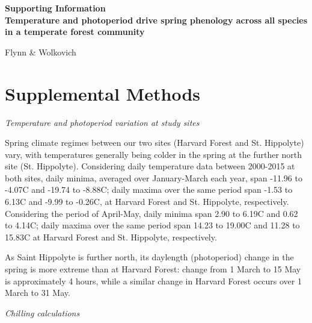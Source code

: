\documentclass{article}
\begin{document}

\begin{center}
\textbf{\Large{Supporting Information \vspace{1ex}\\Temperature and photoperiod drive spring phenology across all species in a temperate forest community}}

Flynn \& Wolkovich
\end{center}

\renewcommand{\thetable}{S\arabic{table}}
\renewcommand{\thefigure}{S\arabic{figure}}

\section*{Supplemental Methods}

\noindent\emph{Temperature and photoperiod variation at study sites}

\noindent Spring climate regimes between our two sites (Harvard Forest and St. Hippolyte) vary, with temperatures generally being colder in the spring at the further north site (St. Hippolyte). Considering daily temperature data between 2000-2015 at both sites, daily minima, averaged over January-March each year, span -11.96 to -4.07\degree C and -19.74 to -8.88\degree C; daily maxima over the same period span -1.53 to 6.13\degree C and -9.99 to -0.26\degree C, at Harvard Forest and St. Hippolyte, respectively. Considering the period of April-May, daily minima span 2.90 to 6.19\degree C and 0.62 to 4.14\degree C; daily maxima over the same period span 14.23 to 19.00\degree C and 11.28 to 15.83\degree C at Harvard Forest and St. Hippolyte, respectively. 

\noindent As Saint Hippolyte is further north, its daylength (photoperiod) change in the spring is more extreme than at Harvard Forest: change from 1 March to 15 May is approximately 4 hours, while a similar change in Harvard Forest occurs over 1 March to 31 May. 

\noindent\emph{Chilling calculations}
\end{document}
